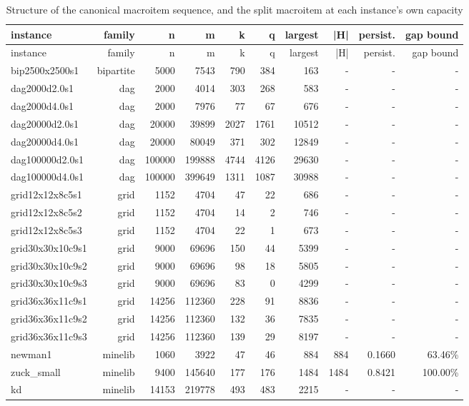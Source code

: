 \begin{longtable}{lrrrrrrrrr}
\caption{Structure of the canonical macroitem sequence, and the split macroitem at each instance's own capacity}\label{tab:structure}\\
\toprule
instance & family & n & m & k & q & largest & |H| & persist. & gap bound \\
\midrule
\endfirsthead
\toprule
instance & family & n & m & k & q & largest & |H| & persist. & gap bound \\
\midrule
\endhead
\bottomrule
\endfoot
bip2500x2500s1 & bipartite & 5000 & 7543 & 790 & 384 & 163 & - & - & - \\
dag2000d2.0s1 & dag & 2000 & 4014 & 303 & 268 & 583 & - & - & - \\
dag2000d4.0s1 & dag & 2000 & 7976 & 77 & 67 & 676 & - & - & - \\
dag20000d2.0s1 & dag & 20000 & 39899 & 2027 & 1761 & 10512 & - & - & - \\
dag20000d4.0s1 & dag & 20000 & 80049 & 371 & 302 & 12849 & - & - & - \\
dag100000d2.0s1 & dag & 100000 & 199888 & 4744 & 4126 & 29630 & - & - & - \\
dag100000d4.0s1 & dag & 100000 & 399649 & 1311 & 1087 & 30988 & - & - & - \\
grid12x12x8c5s1 & grid & 1152 & 4704 & 47 & 22 & 686 & - & - & - \\
grid12x12x8c5s2 & grid & 1152 & 4704 & 14 & 2 & 746 & - & - & - \\
grid12x12x8c5s3 & grid & 1152 & 4704 & 22 & 1 & 673 & - & - & - \\
grid30x30x10c9s1 & grid & 9000 & 69696 & 150 & 44 & 5399 & - & - & - \\
grid30x30x10c9s2 & grid & 9000 & 69696 & 98 & 18 & 5805 & - & - & - \\
grid30x30x10c9s3 & grid & 9000 & 69696 & 83 & 0 & 4299 & - & - & - \\
grid36x36x11c9s1 & grid & 14256 & 112360 & 228 & 91 & 8836 & - & - & - \\
grid36x36x11c9s2 & grid & 14256 & 112360 & 132 & 36 & 7835 & - & - & - \\
grid36x36x11c9s3 & grid & 14256 & 112360 & 139 & 29 & 8197 & - & - & - \\
newman1 & minelib & 1060 & 3922 & 47 & 46 & 884 & 884 & 0.1660 & 63.46\% \\
zuck\_small & minelib & 9400 & 145640 & 177 & 176 & 1484 & 1484 & 0.8421 & 100.00\% \\
kd & minelib & 14153 & 219778 & 493 & 483 & 2215 & - & - & - \\

\end{longtable}
